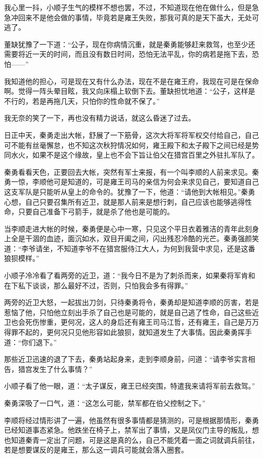 我心里一抖，小顺子生气的模样不想也罢，不过，不知道现在他在做什么，但是急急冲回来不是他会做的事情，毕竟若是雍王失败，那我可真的是天下虽大，无处可逃了。

董缺犹豫了一下道：“公子，现在你病情沉重，就是秦勇能够赶来救驾，也至少还需要将近一天的时间，而且没有数日时间，恐怕无法平乱，你的病若是拖下去，恐怕——”

我知道他的担心，可是现在又有什么办法，现在不是在雍王府，我现在可是在保命啊。觉得一阵头晕目眩，我又向床榻上软倒下去。董缺担忧地道：“公子，这样是不行的，若是再拖几天，只怕你的性命就不保了。”

我无奈的笑了一下，再也没有精力说话，就这么昏迷了过去。

日正中天，秦勇走出大帐，舒展了一下筋骨，这次大将军将军权交付给自己，自己可不能有丝毫懈怠，也不知这次秋狩情况如何，雍王殿下和太子殿下之间已经是势同水火，如果不是这个缘故，皇上也不会下旨让伯父在猎宫百里之外驻扎军队了。

秦勇看看天色，正要回去大帐，突然有军士来报，有一个叫李顺的人前来求见。秦勇一惊，李顺他可是知道的，可是雍王司马的亲信为何会来求见自己，要知道自己这支军队是只能听从皇上的命令的。犹豫了一下，他道：“请他到大帐相见。”秦勇心想，自己只要召集所有近卫，就是那人前来是想行刺，自己应该也能够逃得性命，只要自己准备下弓箭手，就是杀了他也是可能的。

当李顺走进大帐的时候，秦勇便是心中一寒，只见这个平日衣着雅洁的青年此刻身上全是干涸的血迹，面沉如水，双目开阖之间，闪出残忍冷酷的光芒。秦勇强颜笑道：“李爷请坐，不知道李爷不在猎宫服侍江大人，为何到我营中求见，还是这番狼狈模样。”

小顺子冷冷看了看两旁的近卫，道：“我今日不是为了刺杀而来，如果秦将军肯和在下私下谈谈，那么最好不过，否则，只怕我会多有得罪。”

两旁的近卫大怒，一起拔出刀剑，只待秦勇将令，秦勇却是知道李顺的厉害，若是惹恼了他，只怕他立刻出手杀了自己也是可能的，就是自己逃了性命，自己这些近卫也会死伤惨重，更何况，这人的身后还有雍王司马江哲，还有雍王，自己是万万得罪不起的，更何况只见他形容如此狼狈，就知道发生了大事情。因此秦勇挥手道：“你们退下。”

那些近卫迅速的退了下去，秦勇站起身来，走到李顺身前，问道：“请李爷实言相告，猎宫发生了什么事情？”

小顺子看了他一眼，道：“太子谋反，雍王已经突围，特遣我来请将军前去救驾。”

秦勇深吸了一口气，道：“这怎么可能，禁军都在伯父控制之下。”

李顺将经过情形讲了一遍，他虽然有很多事情都是猜测的，可是根据那情形，秦勇已经知道事态紧急。他跌坐在椅子上，禁军出了事情，又是凤仪门主导的叛乱，想也知道秦青一定出了问题，可是这是真的么，自己不能凭着一面之词就调兵前往，若是想要谋反的是雍王，那么这一调兵可能就会落入圈套。

